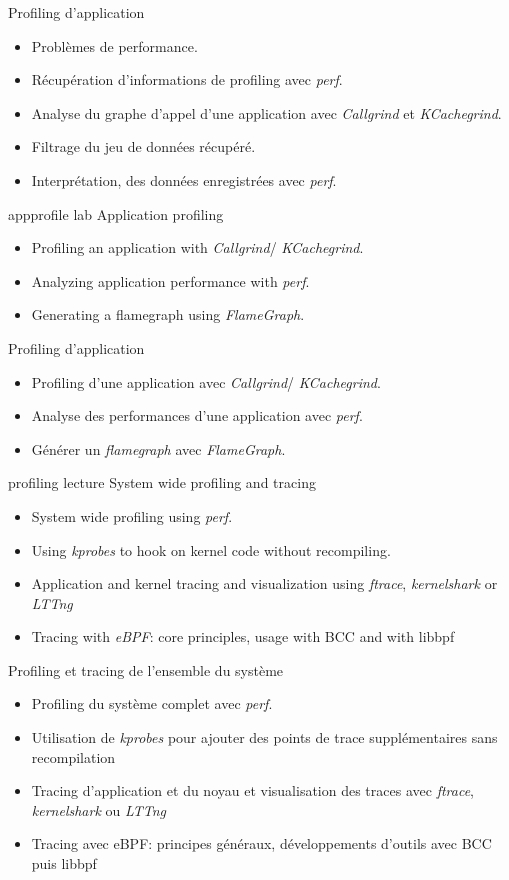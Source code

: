 {Profiling d'application}
{
  \begin{itemize}
  \item Problèmes de performance.
  \item Récupération d'informations de profiling avec {\em perf}.
  \item Analyse du graphe d'appel d'une application avec {\em
      Callgrind} et {\em KCachegrind}.
  \item Filtrage du jeu de données récupéré.
  \item Interprétation, des données enregistrées avec {\em perf}.
  \end{itemize}
}
{appprofile}
{lab}
{Application profiling}
{
  \begin{itemize}
  \item Profiling an application with {\em Callgrind}/{\em
      KCachegrind}.
  \item Analyzing application performance with {\em perf}.
  \item Generating a flamegraph using {\em FlameGraph}.
  \end{itemize}
}
{Profiling d'application}
{
  \begin{itemize}
  \item Profiling d'une application avec {\em Callgrind}/{\em
      KCachegrind}.
  \item Analyse des performances d'une application avec {\em perf}.
  \item Générer un {\em flamegraph} avec {\em FlameGraph}.
  \end{itemize}
}
{profiling}
{lecture}
{System wide profiling and tracing}
{
  \begin{itemize}
  \item System wide profiling using {\em perf}.
  \item Using {\em kprobes} to hook on kernel code without
    recompiling.
    \item Application and kernel tracing and visualization using {\em
        ftrace}, {\em kernelshark} or {\em LTTng}
  \item Tracing with {\em eBPF}: core principles, usage with BCC and with libbpf
  \end{itemize}
}
{Profiling et tracing de l'ensemble du système}
{
  \begin{itemize}
  \item Profiling du système complet avec {\em perf}.
  \item Utilisation de {\em kprobes} pour ajouter des points de trace
    supplémentaires sans recompilation
    \item Tracing d'application et du noyau et visualisation des traces
      avec {\em ftrace}, {\em kernelshark} ou {\em LTTng}
  \item Tracing avec eBPF: principes généraux, développements d'outils avec BCC
  puis libbpf
  \end{itemize}
}
